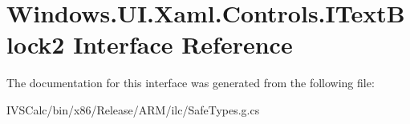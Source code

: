 \hypertarget{interface_windows_1_1_u_i_1_1_xaml_1_1_controls_1_1_i_text_block2}{}\section{Windows.\+U\+I.\+Xaml.\+Controls.\+I\+Text\+Block2 Interface Reference}
\label{interface_windows_1_1_u_i_1_1_xaml_1_1_controls_1_1_i_text_block2}


The documentation for this interface was generated from the following file\+:\begin{DoxyCompactItemize}
\item 
I\+V\+S\+Calc/bin/x86/\+Release/\+A\+R\+M/ilc/Safe\+Types.\+g.\+cs\end{DoxyCompactItemize}
